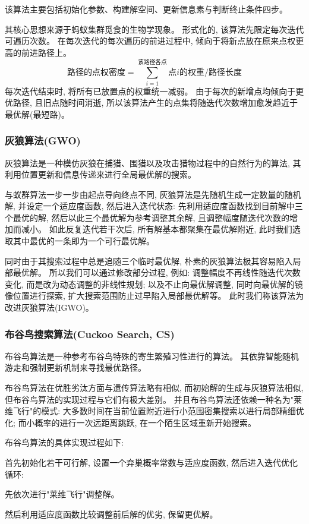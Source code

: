 \documentclass[12pt,a4paper,oneside,UTF8]{ctexart}
\begin{document}
该算法主要包括初始化参数、构建解空间、更新信息素与判断终止条件四步。

其核心思想来源于蚂蚁集群觅食的生物学现象。
形式化的,
该算法先限定每次迭代可遍历次数。
在每次迭代的每次遍历的前进过程中,
倾向于将新点放在原来点权更高的前进路径上。
\[
\text{路径的点权密度} ={ \sum_{i=1}^{\text{该路径各点}}{\text{点}i\text{的权重}} } / \text{路径长度}
\]
每次迭代结束时,
将所有已放置点的权重统一减弱。
由于每次的新增点均倾向于更优路径,
且旧点随时间消逝,
所以该算法产生的点集将随迭代次数增加愈发趋近于最优解(最短路)。
\subsubsection{灰狼算法(GWO)}
灰狼算法是一种模仿灰狼在捕猎、围猎以及攻击猎物过程中的自然行为的算法,
其利用位置更新和信息传递来进行全局最优解的搜索\textsuperscript{\cite{ref9}}。

与蚁群算法一步一步由起点导向终点不同,
灰狼算法是先随机生成一定数量的随机解,
并设定一个适应度函数,
然后进入迭代状态:
先利用适应度函数找到目前解中三个最优的解,
然后以此三个最优解为参考调整其余解,
且调整幅度随迭代次数的增加而减小。
如此反复迭代若干次后,
所有解基本都聚集在最优解附近,
此时我们选取其中最优的一条即为一个可行最优解\textsuperscript{\cite{ref10}}。

同时由于其搜索过程中总是追随三个临时最优解,
朴素的灰狼算法极其容易陷入局部最优解。
所以我们可以通过修改部分过程,
例如:
调整幅度不再线性随迭代次数变化,
而是改为动态调整的非线性规划;
以及不止向最优解调整,
同时向最优解的镜像位置进行探索,
扩大搜索范围防止过早陷入局部最优解等。
此时我们称该算法为改进灰狼算法(IGWO)。
\subsubsection{布谷鸟搜索算法(Cuckoo Search, CS)}
布谷鸟算法是一种参考布谷鸟特殊的寄生繁殖习性进行的算法。
其依靠智能随机游走和强制更新机制来寻找最优路径。

布谷鸟算法在优胜劣汰方面与遗传算法略有相似,
而初始解的生成与灰狼算法相似,
但布谷鸟算法的实现过程与它们有极大差别。
并且布谷鸟算法还依赖一种名为"莱维飞行"的模式:
大多数时间在当前位置附近进行小范围密集搜索以进行局部精细优化;
而小概率的进行一次远距离跳跃,
在一个陌生区域重新开始搜索。

布谷鸟算法的具体实现过程如下:

首先初始化若干可行解,
设置一个弃巢概率常数与适应度函数,
然后进入迭代优化循环:

先依次进行"莱维飞行"调整解。

然后利用适应度函数比较调整前后解的优劣,
保留更优解。
\end{document}
